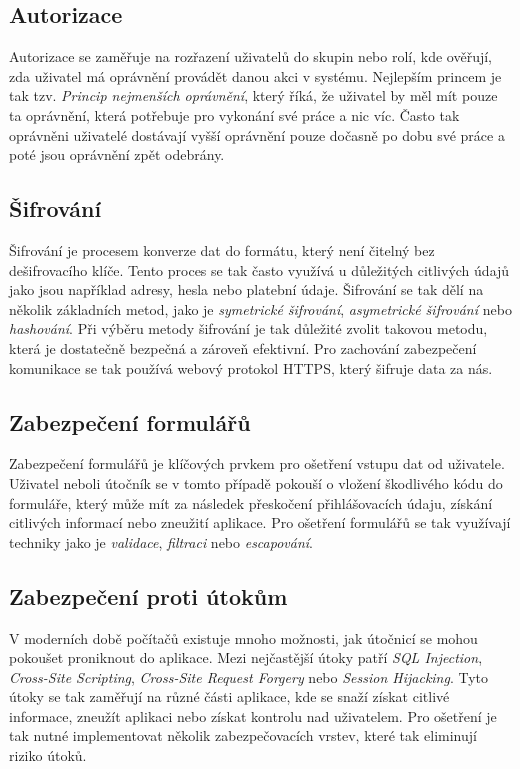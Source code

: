 \subsection{Autorizace}
\label{subsec:security-authorization}
Autorizace se zaměřuje na rozřazení uživatelů do skupin nebo rolí, kde ověřují, zda uživatel má oprávnění provádět danou akci v systému. Nejlepším princem je tak tzv. \textit{Princip nejmenších oprávnění}, který říká, že uživatel by měl mít pouze ta oprávnění, která potřebuje pro vykonání své práce a nic víc. Často tak oprávněni uživatelé dostávají vyšší oprávnění pouze dočasně po dobu své práce a poté jsou oprávnění zpět odebrány.

\subsection{Šifrování}
\label{subsec:security-encryption}
Šifrování je procesem konverze dat do formátu, který není čitelný bez dešifrovacího klíče. Tento proces se tak často využívá u důležitých citlivých údajů jako jsou například adresy, hesla nebo platební údaje. Šifrování se tak dělí na několik základních metod, jako je \textit{symetrické šifrování}, \textit{asymetrické šifrování} nebo \textit{hashování}. Při výběru metody šifrování je tak důležité zvolit takovou metodu, která je dostatečně bezpečná a zároveň efektivní. Pro zachování zabezpečení komunikace se tak používá webový protokol HTTPS, který šifruje data za nás.

\subsection{Zabezpečení formulářů}
\label{subsec:security-forms}
Zabezpečení formulářů je klíčových prvkem pro ošetření vstupu dat od uživatele. Uživatel neboli útočník se v tomto případě pokouší o vložení škodlivého kódu do formuláře, který může mít za následek přeskočení přihlášovacích údaju, získání citlivých informací nebo zneužití aplikace. Pro ošetření formulářů se tak využívají techniky jako je \textit{validace}, \textit{filtraci} nebo \textit{escapování}.

\subsection{Zabezpečení proti útokům}
\label{subsec:security-attacks}
V moderních době počítačů existuje mnoho možnosti, jak útočnicí se mohou pokoušet proniknout do aplikace. Mezi nejčastější útoky patří \textit{SQL Injection}, \textit{Cross-Site Scripting}, \textit{Cross-Site Request Forgery} nebo \textit{Session Hijacking}. Tyto útoky se tak zaměřují na různé části aplikace, kde se snaží získat citlivé informace, zneužít aplikaci nebo získat kontrolu nad uživatelem. Pro ošetření je tak nutné implementovat několik zabezpečovacích vrstev, které tak eliminují riziko útoků.

